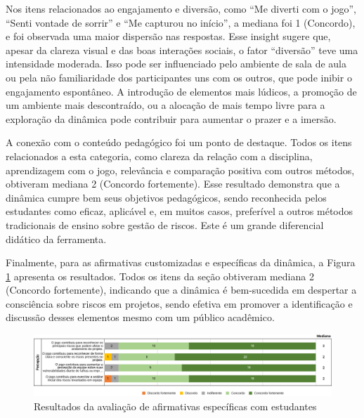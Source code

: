 \documentclass[
	12pt,
	openright,
	twoside,
	a4paper,
	english,
	brazil
	]{abntex2}
\begin{document}
Nos itens relacionados ao engajamento e diversão, como  “Me diverti com o jogo”,  “Senti vontade de sorrir” e  “Me capturou no início”, a mediana foi 1 (Concordo), e foi observada uma maior dispersão nas respostas. Esse insight sugere que, apesar da clareza visual e das boas interações sociais, o fator  “diversão” teve uma intensidade moderada. Isso pode ser influenciado pelo ambiente de sala de aula ou pela não familiaridade dos participantes uns com os outros, que pode inibir o engajamento espontâneo. A introdução de elementos mais lúdicos, a promoção de um ambiente mais descontraído, ou a alocação de mais tempo livre para a exploração da dinâmica pode contribuir para aumentar o prazer e a imersão.

A conexão com o conteúdo pedagógico foi um ponto de destaque. Todos os itens relacionados a esta categoria, como clareza da relação com a disciplina, aprendizagem com o jogo, relevância e comparação positiva com outros métodos, obtiveram mediana 2 (Concordo fortemente). Esse resultado demonstra que a dinâmica cumpre bem seus objetivos pedagógicos, sendo reconhecida pelos estudantes como eficaz, aplicável e, em muitos casos, preferível a outros métodos tradicionais de ensino sobre gestão de riscos. Este é um grande diferencial didático da ferramenta.


Finalmente, para as afirmativas customizadas e específicas da dinâmica, a Figura \ref{ufsc-afirmativas} apresenta os resultados. Todos os itens da seção obtiveram mediana 2 (Concordo fortemente), indicando que a dinâmica é bem-sucedida em despertar a consciência sobre riscos em projetos, sendo efetiva em promover a identificação e discussão desses elementos mesmo com um público acadêmico.

\begin{figure}[H]
	\caption{\label{ufsc-afirmativas} Resultados da avaliação de afirmativas específicas com estudantes}
  \includegraphics[width=\textwidth]{ufsc-afirmativas}
\end{figure}
\end{document}
